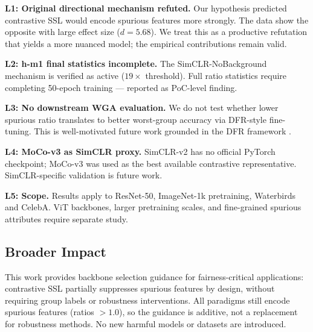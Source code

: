 \textbf{L1: Original directional mechanism refuted.} Our hypothesis predicted contrastive SSL would encode spurious features more strongly. The data show the opposite with large effect size ($d = 5.68$). We treat this as a productive refutation that yields a more nuanced model; the empirical contributions remain valid.

\textbf{L2: h-m1 final statistics incomplete.} The SimCLR-NoBackground mechanism is verified as active ($19\times$ threshold). Full ratio statistics require completing 50-epoch training --- reported as PoC-level finding.

\textbf{L3: No downstream WGA evaluation.} We do not test whether lower spurious ratio translates to better worst-group accuracy via DFR-style fine-tuning. This is well-motivated future work grounded in the DFR framework \citep{Kirichenko2022DFR}.

\textbf{L4: MoCo-v3 as SimCLR proxy.} SimCLR-v2 has no official PyTorch checkpoint; MoCo-v3 was used as the best available contrastive representative. SimCLR-specific validation is future work.

\textbf{L5: Scope.} Results apply to ResNet-50, ImageNet-1k pretraining, Waterbirds and CelebA. ViT backbones, larger pretraining scales, and fine-grained spurious attributes require separate study.

\subsection{Broader Impact}

This work provides backbone selection guidance for fairness-critical applications: contrastive SSL partially suppresses spurious features by design, without requiring group labels or robustness interventions. All paradigms still encode spurious features (ratios $> 1.0$), so the guidance is additive, not a replacement for robustness methods. No new harmful models or datasets are introduced.
